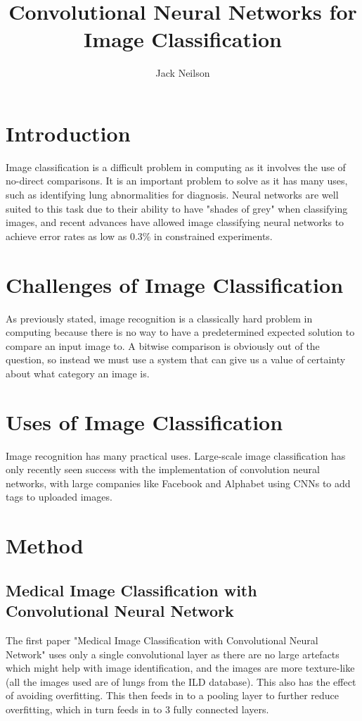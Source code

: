 \documentclass{article}
\begin{document}
\title{Convolutional Neural Networks for Image Classification}
\author{Jack Neilson}

\maketitle
\newpage
\section{Introduction}
Image classification is a difficult problem in computing as it involves the use of no-direct comparisons. It is an important problem to solve as it has many uses, such as identifying lung abnormalities for diagnosis\cite{medical}. Neural networks are well suited to this task due to their ability to have "shades of grey" when classifying images, and recent advances have allowed image classifying neural networks to achieve error rates as low as 0.3\% in constrained experiments\cite{imagenet}.

\section{Challenges of Image Classification}
As previously stated, image recognition is a classically hard problem in computing because there is no way to have a predetermined expected solution to compare an input image to. A bitwise comparison is obviously out of the question, so instead we must use a system that can give us a value of certainty about what category an image is.

\section{Uses of Image Classification}
Image recognition has many practical uses. Large-scale image classification has only recently seen success with the implementation of convolution neural networks, with large companies like Facebook and Alphabet using CNNs to add tags to uploaded images.

\section{Method}
\subsection{Medical Image Classification with Convolutional Neural Network}
The first paper "Medical Image Classification with Convolutional Neural Network" uses only a single convolutional layer as there are no large artefacts which might help with image identification, and the images are more texture-like (all the images used are of lungs from the ILD database)\cite{medical}. This also has the effect of avoiding overfitting\cite{medical}. This then feeds in to a pooling layer to further reduce overfitting, which in turn feeds in to 3 fully connected layers.
\end{document}
